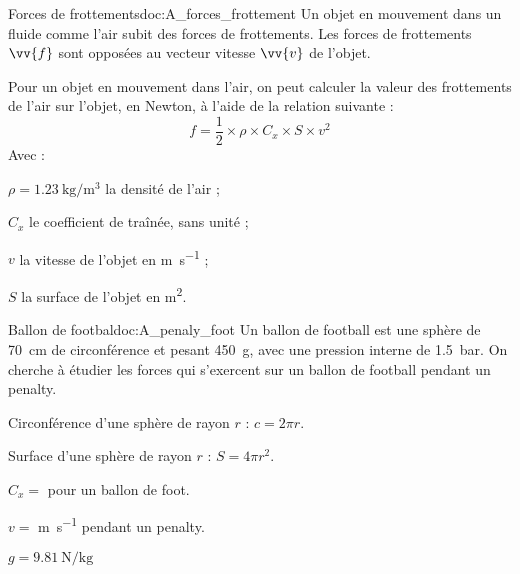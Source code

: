 
\begin{doc}{Forces de frottements}{doc:A_forces_frottement}
  Un objet en mouvement dans un fluide comme l'air subit des forces de frottements.
  Les forces de frottements $\vv{f}$ sont opposées au vecteur vitesse $\vv{v}$ de l'objet.
  
  Pour un objet en mouvement dans l'air, on peut calculer la valeur des frottements de l'air sur l'objet, en Newton, à l'aide de la relation suivante : 
  \begin{equation*}
    f = \dfrac{1}{2} \times \rho \times C_x \times S \times v^2
  \end{equation*}
  Avec :
  \begin{listePoints}[2]
    \item $\rho = \qty{1,23}{\kg\per\cubic\m}$ la densité de l'air ;
    \item $C_x$ le coefficient de traînée, sans unité ;
    \item $v$ la vitesse de l'objet en \unit{\m\per\s} ;
    \item $S$ la surface de l'objet en \unit{\m\squared}.
  \end{listePoints}
\end{doc}

\begin{doc}{Ballon de footbal}{doc:A_penaly_foot}
  Un ballon de football est une sphère de \qty{70}{\cm} de circonférence et pesant \qty{450}{\g}, avec une pression interne de \qty{1,5}{\bar}.  
  On cherche à étudier les forces qui s'exercent sur un ballon de football pendant un penalty.
  
  \begin{donnees}
    \item Circonférence d'une sphère de rayon $r$ : $c = 2\pi r$.
    \item Surface d'une sphère de rayon $r$ : $S = 4\pi r^2$.
    \item $C_x =$  pour un ballon de foot.
    \item $v =$ \unit{\m\per\s} pendant un penalty.
    \item $g = \qty{9.81}{\newton\per\kg}$
  \end{donnees}
\end{doc}


